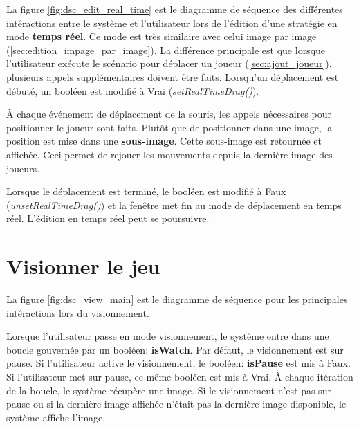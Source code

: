 La figure \ref{fig:dsc_edit_real_time} est le diagramme de séquence des différentes intéractions entre le système et l'utilisateur lors de l'édition d'une stratégie en mode \textbf{temps réel}.
Ce mode est très similaire avec celui image par image (\ref{sec:edition_impage_par_image}).
La différence principale est que lorsque l'utilisateur exécute le scénario pour déplacer un joueur (\ref{sec:ajout_joueur}), plusieurs appels supplémentaires doivent être faits.
Lorsqu'un déplacement est débuté, un booléen est modifié à Vrai (\textit{setRealTimeDrag()}).

À chaque événement de déplacement de la souris, les appels nécessaires pour positionner le joueur sont faits.
Plutôt que de positionner dans une image, la position est mise dans une \textbf{sous-image}.
Cette sous-image est retournée et affichée.
Ceci permet de rejouer les mouvements depuis la dernière image des joueurs.

Lorsque le déplacement est terminé, le booléen est modifié à Faux (\textit{unsetRealTimeDrag()}) et la fenêtre met fin au mode de déplacement en temps réel.
L'édition en temps réel peut se poursuivre.

\section{Visionner le jeu}
\label{sec:visionner_jeu}


La figure \ref{fig:dsc_view_main} est le diagramme de séquence pour les principales intéractions lors du visionnement.

Lorsque l'utilisateur passe en mode visionnement, le système entre dans une boucle gouvernée par un booléen: \textbf{isWatch}.
Par défaut, le visionnement est sur pause.
Si l'utilisateur active le visionnement, le booléen: \textbf{isPause} est mis à Faux.
Si l'utilisateur met sur pause, ce même booléen est mis à Vrai.
À chaque itération de la boucle, le système récupère une image.
Si le visionnement n'est pas sur pause ou si la dernière image affichée n'était pas la dernière image disponible, le système affiche l'image.


